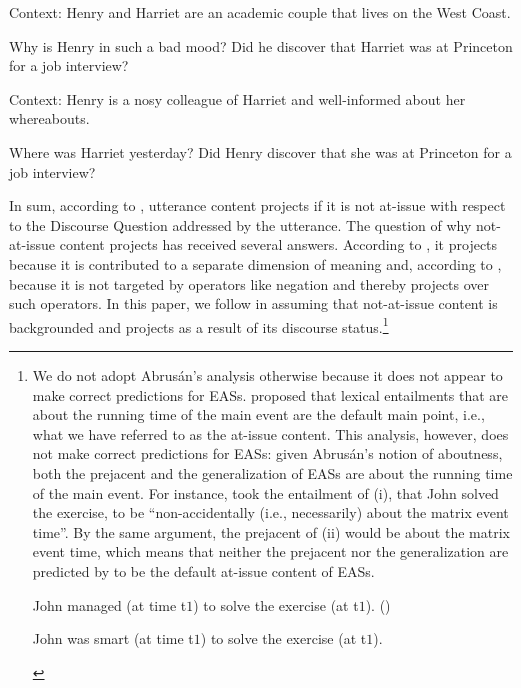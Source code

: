 \documentclass[11pt,fleqn]{article}
\newcommand{\6}{\mbox{$[\hspace*{-.6mm}[$}}
\newcommand{\9}{\mbox{$]\hspace*{-.6mm}]$}}
\begin{document}
\begin{exe}
\ex\label{discover3}
\begin{xlist}

\ex Context: Henry and Harriet are an academic couple that lives on the West Coast. 
\begin{xlist}
 Why is Henry in such a bad mood?
 Did he discover that Harriet was at Princeton for a job interview?
\end{xlist}

\ex Context: Henry is a nosy colleague of Harriet and well-informed about her whereabouts.
\begin{xlist}
 Where was Harriet yesterday?
 Did Henry discover that she was at Princeton for a job interview?
\end{xlist}

\end{xlist}
\end{exe}
In sum, according to \citealt{best-question}, utterance content projects if it is not at-issue with respect to the Discourse Question addressed by the utterance. The question of why not-at-issue content projects has received several answers. According to \citet{potts05}, it projects because it is contributed to a separate dimension of meaning and, according to \citet{brst-salt10}, because it is not targeted by operators like negation and thereby projects over such operators. In this paper, we follow \citealt{abrusan2011,abrusan2016} in assuming that not-at-issue content is backgrounded and projects as a result of its discourse status.\footnote{We do not adopt Abrus\'an's analysis otherwise because it does not appear to make correct predictions for EASs. \citet{abrusan2011} proposed that lexical entailments that are about the running time of the main event are the default main point, i.e., what we have referred to as the at-issue content. This analysis, however, does not make correct predictions for EASs: given Abrus\'an's notion of aboutness, both the prejacent and the generalization of EASs are about the running time of the main event. For instance, \citet[508]{abrusan2011} took the entailment of (i), that John solved the exercise, to be ``non-accidentally (i.e., necessarily) about the matrix event time''. By the same argument, the prejacent of (ii) would be about the matrix event time, which means that neither the prejacent nor the generalization are predicted by \citealt{abrusan2011} to be the default at-issue content of EASs.

\begin{exe}
 John managed (at time t$ {\mbox{1}}$) to solve the exercise (at t$ {\mbox{1}}$). \hfill (\citealt[508]{abrusan2011})

 John was smart (at time t$ {\mbox{1}}$) to solve the exercise (at t$ {\mbox{1}}$).

\end{exe}} 
\end{document}
